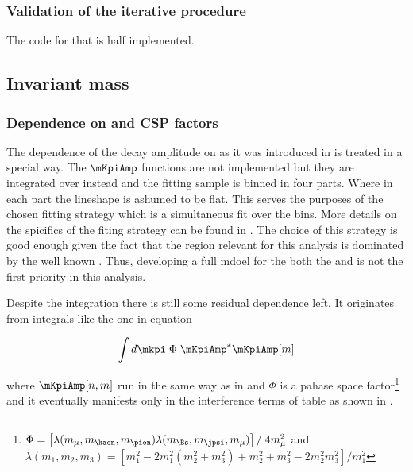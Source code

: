 \subsubsection{Validation of the iterative procedure}
{\color{red} The code for that is half implemented.}

\subsection{\Kpi Invariant mass}
\label{Kpi_Invariant_mass}

\subsubsection{Dependence on \mkpi and CSP factors}
The dependence of the \BJpsiKpi decay amplitude on \mkpi as it was introduced in  is treated in a special way.
The $\mKpiAmp$ functions are not implemented but they are integrated over \mkpi instead and the fitting sample is binned in four parts.
Where in each part the \mkpi lineshape is ashumed to be flat. This serves the purposes of the chosen fitting strategy which is a
simultaneous fit over the \mkpi bins. More details on the spicifics of the fiting strategy can be found in .
The choice of this strategy is good enough given the fact that the \mkpi region relevant for this analysis is dominated by the well
known \pwave. Thus, developing a full mdoel for the both the \pwave and \swave is not the first priority in this analysis.

Despite the \mkpi integration there is still some residual dependence left. It originates from integrals
like the one in equation 

\begin{equation}
  \label{spIntegrals}
  \int d\mkpi \; \Phi \; \mKpiAmp^* \mKpiAmp[m]
\end{equation}

\noindent where $\mKpiAmp[n,m]$ run in the same way as in  and $\Phi$ is a pahase space 
factor\footnote{$\Phi = \left[ \lambda(m_\mu,m_\kaon,m_\pion) \lambda(m_{\Bs},m_\jpsi,m_\mu) \right] / \; 4 m_\mu^2$  and \\ 
$\lambda(m_1,m_2,m_3) = \left[ m_1^2 - 2m_1^2(m_2^2 + m_3^2) + m_2^2 + m_3^2 - 2m_2^2m_3^2 \right] / m_1^2 $  
} and it eventually manifests only in the \spwave interference terms of table  as shown
in .

